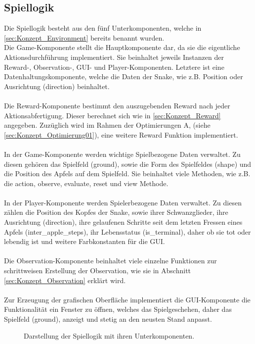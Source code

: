 \subsection{Spiellogik} \label{sec:Konzept_Spiellogik}
Die Spiellogik besteht aus den fünf Unterkomponenten, welche in \ref{sec:Konzept_Environment} bereits benannt wurden.\\
Die Game-Komponente stellt die Hauptkomponente dar, da sie die eigentliche Aktionsdurchführung implementiert. Sie beinhaltet jeweils Instanzen der Reward-, Observation-, GUI- und Player-Komponenten. Letztere ist eine Datenhaltungskomponente, welche die Daten der Snake, wie z.B. Position oder Ausrichtung (direction) beinhaltet.\\
\\Die Reward-Komponente bestimmt den auszugebenden Reward nach jeder Aktionsabfertigung. Dieser berechnet sich wie in \ref{sec:Konzept_Reward} angegeben. Zuzüglich wird im Rahmen der Optimierungen A, (siehe \ref{sec:Konzept_Optimierung01}), eine weitere Reward Funktion implementiert.\\
\\In der Game-Komponente werden wichtige Spielbezogene Daten verwaltet. Zu diesen gehören das Spielfeld (ground), sowie die Form des Spielfeldes (shape) und die Position des Apfels auf dem Spielfeld. Sie beinhaltet viele Methoden, wie z.B. die action, observe, evaluate, reset und view Methode.\\
\\In der Player-Komponente werden Spielerbezogene Daten verwaltet. Zu diesen zählen die Position des Kopfes der Snake, sowie ihrer Schwanzglieder, ihre Ausrichtung (direction), ihre gelaufenen Schritte seit dem letzten Fressen eines Apfels (inter\_apple\_steps), ihr Lebensstatus (is\_terminal), daher ob sie tot oder lebendig ist und weitere Farbkonstanten für die GUI.\\
\\Die Observation-Komponente beinhaltet viele einzelne Funktionen zur schrittweisen Erstellung der Observation, wie sie in Abschnitt \ref{sec:Konzept_Observation} erklärt wird.\\
\\Zur Erzeugung der grafischen Oberfläche implementiert die GUI-Komponente die Funktionalität ein Fenster zu öffnen, welches das Spielgeschehen, daher das Spielfeld (ground), anzeigt und stetig an den neusten Stand anpasst.
\begin{figure}[H]
	\centering
	\def\svgscale{0.17}
	
	\caption[Spiellogik]{Darstellung der Spiellogik mit ihren Unterkomponenten.}
	\label{fig:Spiellogik}
\end{figure}

